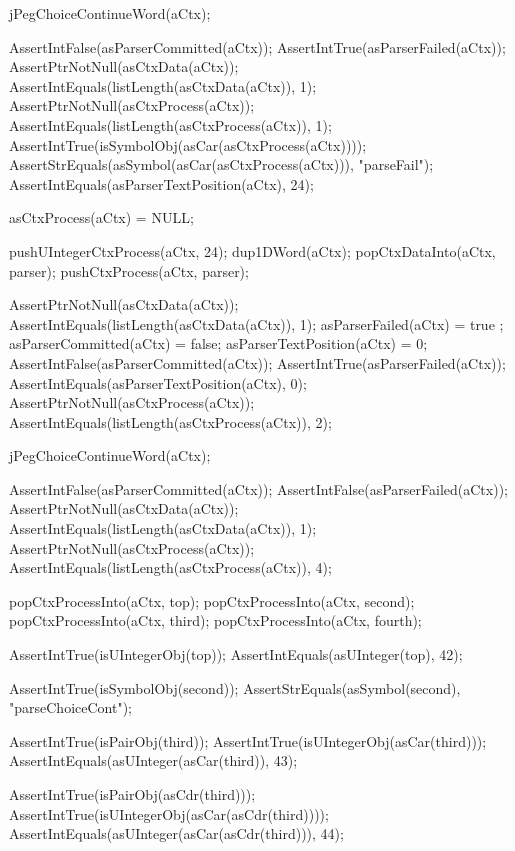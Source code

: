   jPegChoiceContinueWord(aCtx);
  
  AssertIntFalse(asParserCommitted(aCtx));
  AssertIntTrue(asParserFailed(aCtx));
  AssertPtrNotNull(asCtxData(aCtx));
  AssertIntEquals(listLength(asCtxData(aCtx)), 1);
  AssertPtrNotNull(asCtxProcess(aCtx));
  AssertIntEquals(listLength(asCtxProcess(aCtx)), 1);
  AssertIntTrue(isSymbolObj(asCar(asCtxProcess(aCtx))));
  AssertStrEquals(asSymbol(asCar(asCtxProcess(aCtx))), "parseFail");
  AssertIntEquals(asParserTextPosition(aCtx), 24);
\stopCTest
\stopTestCase


\startCTest
  asCtxProcess(aCtx) = NULL;
  
  pushUIntegerCtxProcess(aCtx, 24);
  dup1DWord(aCtx);
  popCtxDataInto(aCtx, parser);
  pushCtxProcess(aCtx, parser);
  
  AssertPtrNotNull(asCtxData(aCtx));
  AssertIntEquals(listLength(asCtxData(aCtx)), 1);
  asParserFailed(aCtx)       = true ;
  asParserCommitted(aCtx)    = false;
  asParserTextPosition(aCtx) = 0;
  AssertIntFalse(asParserCommitted(aCtx));
  AssertIntTrue(asParserFailed(aCtx));
  AssertIntEquals(asParserTextPosition(aCtx), 0);
  AssertPtrNotNull(asCtxProcess(aCtx));
  AssertIntEquals(listLength(asCtxProcess(aCtx)), 2);
  
  jPegChoiceContinueWord(aCtx); 
  
  AssertIntFalse(asParserCommitted(aCtx)); 
  AssertIntFalse(asParserFailed(aCtx));
  AssertPtrNotNull(asCtxData(aCtx)); 
  AssertIntEquals(listLength(asCtxData(aCtx)), 1); 
  AssertPtrNotNull(asCtxProcess(aCtx));
  AssertIntEquals(listLength(asCtxProcess(aCtx)), 4);
  
  popCtxProcessInto(aCtx, top);
  popCtxProcessInto(aCtx, second);
  popCtxProcessInto(aCtx, third);
  popCtxProcessInto(aCtx, fourth);
  
  AssertIntTrue(isUIntegerObj(top));
  AssertIntEquals(asUInteger(top), 42);    

  AssertIntTrue(isSymbolObj(second));
  AssertStrEquals(asSymbol(second), "parseChoiceCont");
  
  AssertIntTrue(isPairObj(third));
  AssertIntTrue(isUIntegerObj(asCar(third)));
  AssertIntEquals(asUInteger(asCar(third)), 43);
  
  AssertIntTrue(isPairObj(asCdr(third)));
  AssertIntTrue(isUIntegerObj(asCar(asCdr(third))));
  AssertIntEquals(asUInteger(asCar(asCdr(third))), 44);
  
